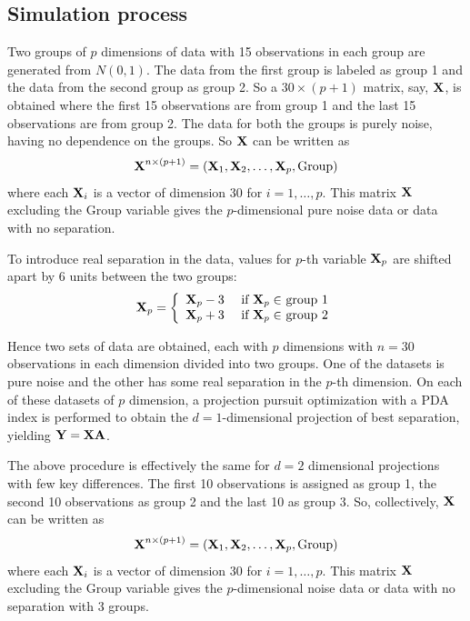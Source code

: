 \subsection{Simulation process}

Two groups of $p$ dimensions of data with 15 observations in each group are generated from $N(0, 1)$.  The data from the first group is labeled as group 1 and the data from the second group as group 2. So a $30 \times (p + 1)$ matrix, say, ${\mbox{\boldmath {\bf X}}}$, is obtained where the first 15 observations are from group 1 and the last 15 observations are from group 2. The data for both the groups is purely noise, having no dependence on the groups. So ${\mbox{\boldmath {\bf X}}}$ can be written as
$${\mbox{\boldmath {\bf X}}}^{n \times (p + 1)} = ({\mbox{\boldmath {\bf X}}}_1, {\mbox{\boldmath {\bf X}}}_2, \dots, {\mbox{\boldmath {\bf X}}}_p, \hbox{Group})$$ where each ${\mbox{\boldmath {\bf X}}}_i$ is a vector of dimension 30 for $i = 1, \dots, p$. This matrix ${\mbox{\boldmath {\bf X}}}$ excluding the Group variable gives the $p$-dimensional pure noise data or data with no separation.

To introduce real separation in the data, values for $p$-th variable ${\mbox{\boldmath {\bf X}}}_p$ are shifted apart by 6 units between the two groups: 
$$
{\mbox{\boldmath {\bf X}}}_p = \left\{ \begin{array}{rl}
 {\mbox{\boldmath {\bf X}}}_p - 3 &\mbox{ if $ {\mbox{\boldmath {\bf X}}}_p \in$ group 1} \\
 {\mbox{\boldmath {\bf X}}}_p + 3 &\mbox{ if $ {\mbox{\boldmath {\bf X}}}_p \in$ group 2}
       \end{array} \right.
$$

Hence two sets of data are obtained, each with $p$ dimensions with $n = 30$ observations in each dimension divided into two groups. One of the datasets is pure noise and the other has some real separation in the $p$-th dimension. On each of these datasets of $p$ dimension, a projection pursuit optimization with a PDA index is performed to obtain the $d = 1$-dimensional projection of best separation, yielding $\mbox{\boldmath {\bf Y}} = \mbox{\boldmath {\bf X}} \mbox{\boldmath {\bf A}}$.  

The above procedure is effectively the same for $d = 2$ dimensional projections with few key differences. The first 10 observations is assigned as group 1, the second 10 observations as group 2 and the last 10 as group 3.  So, collectively,  ${\mbox{\boldmath {\bf X}}}$ can be written as
$$ {\mbox{\boldmath {\bf X}}}^{n \times (p + 1)} = ( {\mbox{\boldmath {\bf X}}}_1,  {\mbox{\boldmath {\bf X}}}_2, \dots, {\mbox{\boldmath {\bf X}}}_p, \hbox{Group})$$ where each $ {\mbox{\boldmath {\bf X}}}_i$ is a vector of dimension 30 for $i = 1, \dots, p$. This matrix ${\mbox{\boldmath {\bf X}}}$ excluding the Group variable gives the $p$-dimensional noise data or data with no separation with 3 groups.

